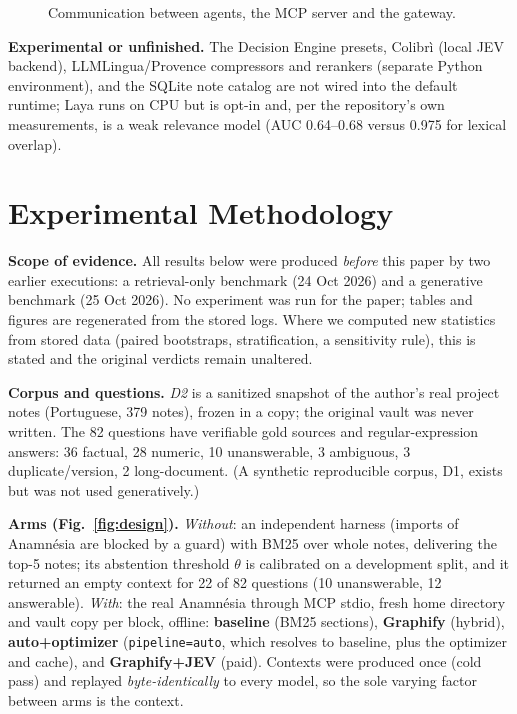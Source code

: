 \documentclass[conference,onecolumn,11pt]{IEEEtran}
\newcommand{\anam}{Anam\-n\'esia}
\begin{document}
\begin{figure}[!htbp]\centering
{}
\caption{Communication between agents, the MCP server and the gateway.}\label{fig:agents}
\end{figure}

\textbf{Experimental or unfinished.} The Decision Engine presets, Colibr\`i (local JEV backend), LLMLingua/Provence compressors and rerankers (separate Python environment), and the SQLite note catalog are not wired into the default runtime; Laya runs on CPU but is opt-in and, per the repository's own measurements, is a weak relevance model (AUC 0.64--0.68 versus 0.975 for lexical overlap).

\FloatBarrier
\section{Experimental Methodology}\label{sec:method}
\textbf{Scope of evidence.} All results below were produced \emph{before} this paper by two earlier executions: a retrieval-only benchmark (24 Oct 2026) and a generative benchmark (25 Oct 2026). No experiment was run for the paper; tables and figures are regenerated from the stored logs. Where we computed new statistics from stored data (paired bootstraps, stratification, a sensitivity rule), this is stated and the original verdicts remain unaltered.

\textbf{Corpus and questions.} \emph{D2} is a sanitized snapshot of the author's real project notes (Portuguese, 379 notes), frozen in a copy; the original vault was never written. The 82 questions have verifiable gold sources and regular-expression answers: 36 factual, 28 numeric, 10 unanswerable, 3 ambiguous, 3 duplicate/version, 2 long-document. (A synthetic reproducible corpus, D1, exists but was not used generatively.)

\textbf{Arms (Fig.~\ref{fig:design}).} \emph{Without}: an independent harness (imports of \anam{} are blocked by a guard) with BM25 over whole notes, delivering the top-5 notes; its abstention threshold $\theta$ is calibrated on a development split, and it returned an empty context for 22 of 82 questions (10 unanswerable, 12 answerable). \emph{With}: the real \anam{} through MCP stdio, fresh home directory and vault copy per block, offline: \textbf{baseline} (BM25 sections), \textbf{Graphify} (hybrid), \textbf{auto+optimizer} (\texttt{pipeline=auto}, which resolves to baseline, plus the optimizer and cache), and \textbf{Graphify+JEV} (paid). Contexts were produced once (cold pass) and replayed \emph{byte-identically} to every model, so the sole varying factor between arms is the context.
\end{document}
